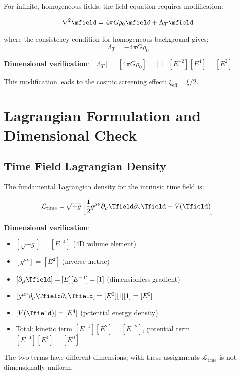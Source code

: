 	For infinite, homogeneous fields, the field equation requires modification:
	
	\begin{equation}
		\nabla^2 \mfield = 4\pi G \rho_0 \mfield + \Lambda_T \mfield
		\label{eq:modified_field_equation}
	\end{equation}
	
	where the consistency condition for homogeneous background gives:
	\begin{equation}
		\Lambda_T = -4\pi G \rho_0
		\label{eq:lambda_t_definition}
	\end{equation}
	
	\textbf{Dimensional verification}: $[\Lambda_T] = [4\pi G \rho_0] = [1][E^{-2}][E^4] = [E^2]$ \checkmark
	
	This modification leads to the cosmic screening effect: $\xi_{\text{eff}} = \xi/2$.
	
	\section{Lagrangian Formulation and Dimensional Check}
	\label{sec:lagrangian_formulation}
	
	\subsection{Time Field Lagrangian Density}
	\label{subsec:time_field_lagrangian}
	
	The fundamental Lagrangian density for the intrinsic time field is:
	
	\begin{equation}
		\mathcal{L}_{\text{time}} = \sqrt{-g} \left[\frac{1}{2} g^{\mu\nu} \partial_\mu \Tfield \partial_\nu \Tfield - V(\Tfield)\right]
		\label{eq:time_field_lagrangian}
	\end{equation}
	
	\textbf{Dimensional verification}:
	\begin{itemize}
		\item $[\sqrt{-g}] = [E^{-4}]$ (4D volume element)
		\item $[g^{\mu\nu}] = [E^2]$ (inverse metric)
		\item $[\partial_\mu \Tfield] = [E][E^{-1}] = [1]$ (dimensionless gradient)
		\item $[g^{\mu\nu} \partial_\mu \Tfield \partial_\nu \Tfield] = [E^2][1][1] = [E^2]$
		\item $[V(\Tfield)] = [E^4]$ (potential energy density)
		\item Total: kinetic term $[E^{-4}][E^2] = [E^{-2}]$, potential term $[E^{-4}][E^4] = [E^0]$
	\end{itemize}
	The two terms have different dimensions; with these assignments $\mathcal{L}_{\text{time}}$ is not dimensionally uniform.
	
